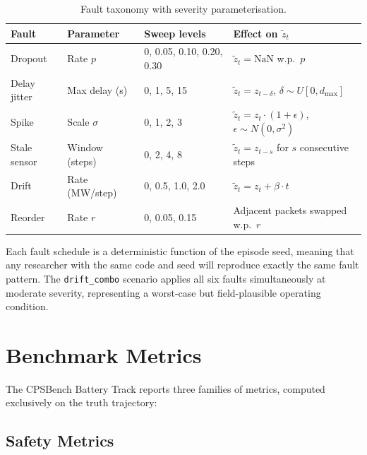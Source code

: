 \begin{table}[ht]
\centering
\caption{Fault taxonomy with severity parameterisation.}
\label{tab:fault-taxonomy-cpsbench}
\begin{tabular}{llll}
\toprule
\textbf{Fault} & \textbf{Parameter} & \textbf{Sweep levels} &
  \textbf{Effect on $\tilde{z}_t$} \\
\midrule
Dropout       & Rate $p$         & 0, 0.05, 0.10, 0.20, 0.30 &
  $\tilde{z}_t = \mathrm{NaN}$ w.p.\ $p$ \\
Delay jitter  & Max delay (s)    & 0, 1, 5, 15 &
  $\tilde{z}_t = z_{t-\delta}$, $\delta \sim U[0, d_{\max}]$ \\
Spike         & Scale $\sigma$   & 0, 1, 2, 3 &
  $\tilde{z}_t = z_t \cdot (1 + \epsilon)$, $\epsilon \sim N(0, \sigma^2)$ \\
Stale sensor  & Window (steps)   & 0, 2, 4, 8 &
  $\tilde{z}_t = z_{t-s}$ for $s$ consecutive steps \\
Drift         & Rate (MW/step)   & 0, 0.5, 1.0, 2.0 &
  $\tilde{z}_t = z_t + \beta \cdot t$ \\
Reorder       & Rate $r$         & 0, 0.05, 0.15 &
  Adjacent packets swapped w.p.\ $r$ \\
\bottomrule
\end{tabular}
\end{table}

Each fault schedule is a deterministic function of the episode seed,
meaning that any researcher with the same code and seed will reproduce
exactly the same fault pattern.  The \texttt{drift\_combo} scenario
applies all six faults simultaneously at moderate severity, representing a
worst-case but field-plausible operating condition.

\section{Benchmark Metrics}

The CPSBench Battery Track reports three families of metrics, computed
exclusively on the truth trajectory:

\subsection{Safety Metrics}

